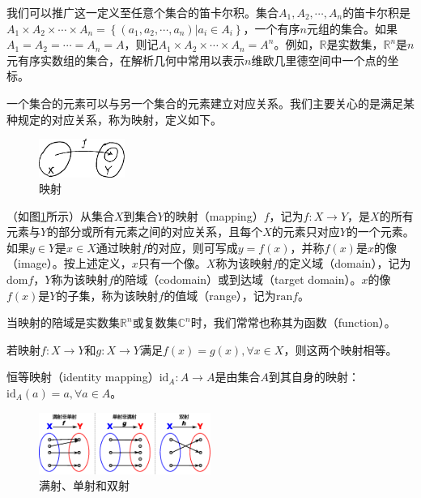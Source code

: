 \documentclass[main.tex]{subfiles}
\begin{document}
我们可以推广这一定义至任意个集合的笛卡尔积。集合$A_1,A_2,\cdots,A_n$的笛卡尔积是$A_1\times A_2\times\cdots\times A_n=\left\{\left(a_1,a_2,\cdots,a_n\right)|a_i\in A_i\right\}$，一个有序$n$元组的集合。如果$A_1=A_2=\cdots=A_n=A$，则记$A_1\times A_2\times\cdots\times A_n=A^n$。例如，$\mathbb{R}$是实数集，$\mathbb{R}^n$是$n$元有序实数组的集合，在解析几何中常用以表示$n$维欧几里德空间中一个点的坐标。

一个集合的元素可以与另一个集合的元素建立对应关系。我们主要关心的是满足某种规定的对应关系，称为映射，定义如下。

\begin{figure}[htbp]
\centering
\includegraphics[width=0.25\textwidth]{images/II.1.1.eps}
\caption{映射}
\label{fig:II.1.1}
\end{figure}

\begin{definition}[映射]
（如图\ref{fig:II.1.1}所示）从集合$X$到集合$Y$的映射（mapping）$f$，记为$f:X\rightarrow Y$，是$X$的所有元素与$Y$的部分或所有元素之间的对应关系，且每个$X$的元素只对应$Y$的一个元素。如果$y\in Y$是$x\in X$通过映射$f$的对应，则可写成$y=f\left(x\right)$，并称$f\left(x\right)$是$x$的像（image）。按上述定义，$x$只有一个像。$X$称为该映射$f$的定义域（domain），记为$\mathrm{dom}f$，$Y$称为该映射$f$的陪域（codomain）或到达域（target domain）。$x$的像$f\left(x\right)$是$Y$的子集，称为该映射$f$的值域（range），记为$\mathrm{ran}f$。
\end{definition}

当映射的陪域是实数集$\mathbb{R}^n$或复数集$\mathbb{C}^n$时，我们常常也称其为函数（function）。

\begin{definition}[映射的相等]
若映射$f:X\rightarrow Y$和$g:X\rightarrow Y$满足$f\left(x\right)=g\left(x\right),\forall x\in X$，则这两个映射相等。
\end{definition}

\begin{definition}[恒等映射]
恒等映射（identity mapping）$\mathrm{id}_A:A\rightarrow A$是由集合$A$到其自身的映射：$\mathrm{id}_A\left(a\right)=a,\forall a\in A$。
\end{definition}

\begin{figure}[htbp]
\centering
\includegraphics[width=0.5\textwidth]{images/II.1.2.eps}
\caption{满射、单射和双射}
\label{fig:II.1.2}
\end{figure}
\end{document}
